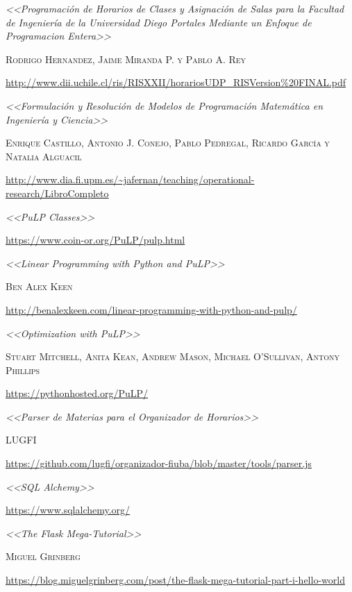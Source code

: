 \documentclass[a4paper]{article}
\begin{document}
\begin{thebibliography}{X}

 \textit{<<Programación de Horarios de Clases y Asignación de Salas para la Facultad de Ingeniería de la Universidad Diego Portales Mediante un Enfoque de Programacion Entera>>}

\textsc{Rodrigo Hernandez, Jaime Miranda P. y Pablo A. Rey}

\url{http://www.dii.uchile.cl/ris/RISXXII/horariosUDP_RISVersion%20FINAL.pdf}


 \textit{<<Formulación y Resolución de Modelos de Programación Matemática en Ingeniería y Ciencia>>}

\textsc{Enrique Castillo, Antonio J. Conejo, Pablo Pedregal, Ricardo García y Natalia Alguacil}

\url{http://www.dia.fi.upm.es/~jafernan/teaching/operational-research/LibroCompleto}


 \textit{<<PuLP Classes>>}

\url{https://www.coin-or.org/PuLP/pulp.html}


 \textit{<<Linear Programming with Python and PuLP>>}

\textsc{Ben Alex Keen}

\url{http://benalexkeen.com/linear-programming-with-python-and-pulp/}


 \textit{<<Optimization with PuLP>>}

\textsc{Stuart Mitchell, Anita Kean, Andrew Mason, Michael O’Sullivan, Antony Phillips}

\url{https://pythonhosted.org/PuLP/}


 \textit{<<Parser de Materias para el Organizador de Horarios>>}

\textsc{LUGFI}

\url{https://github.com/lugfi/organizador-fiuba/blob/master/tools/parser.js}


 \textit{<<SQL Alchemy>>}

\url{https://www.sqlalchemy.org/}


 \textit{<<The Flask Mega-Tutorial>>}

\textsc{Miguel Grinberg}

\url{https://blog.miguelgrinberg.com/post/the-flask-mega-tutorial-part-i-hello-world}


\end{thebibliography}
\end{document}
